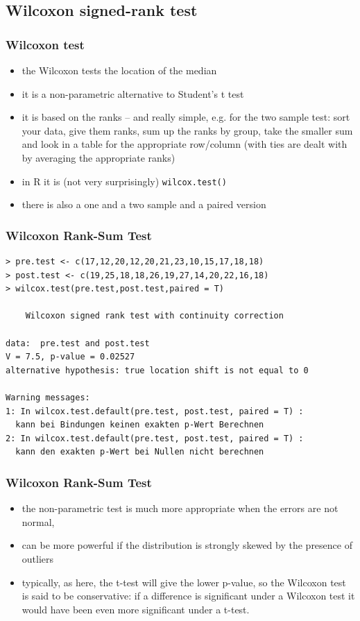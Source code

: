 \documentclass[xcolor={table}]{beamer}
\begin{document}
\subsection{Wilcoxon signed-rank test}
\begin{frame}\frametitle{Wilcoxon test}
    \begin{itemize}
    \item the Wilcoxon tests the location of the median
    \item it is a non-parametric alternative to Student's t test
    \item it is based on the ranks -- and really simple, e.g. for the two sample test: sort your data, give them ranks, sum up the ranks by group, take the smaller sum and look in a table for the appropriate row/column (with ties are dealt with by averaging the appropriate ranks) 
    \item in R it is (not very surprisingly) \texttt{wilcox.test()}
    \item there is also a one and a two sample and a paired version
    \end{itemize}
\end{frame}

\begin{frame}[fragile]\frametitle{Wilcoxon Rank-Sum Test}\footnotesize
\begin{verbatim}
> pre.test <- c(17,12,20,12,20,21,23,10,15,17,18,18)
> post.test <- c(19,25,18,18,26,19,27,14,20,22,16,18)
> wilcox.test(pre.test,post.test,paired = T)

	Wilcoxon signed rank test with continuity correction

data:  pre.test and post.test
V = 7.5, p-value = 0.02527
alternative hypothesis: true location shift is not equal to 0

Warning messages:
1: In wilcox.test.default(pre.test, post.test, paired = T) :
  kann bei Bindungen keinen exakten p-Wert Berechnen
2: In wilcox.test.default(pre.test, post.test, paired = T) :
  kann den exakten p-Wert bei Nullen nicht berechnen
\end{verbatim}
\end{frame}

\begin{frame}[fragile]\frametitle{Wilcoxon Rank-Sum Test}
\begin{itemize}
\item the non-parametric test is much more appropriate when the errors are not normal, 
\item can be more powerful if the distribution is strongly skewed by the presence of outliers
\item typically, as here, the t-test will give the lower p-value, so the Wilcoxon test is said to be conservative: if a difference is significant under a Wilcoxon test it would have been even more significant under a t-test.
\end{itemize}
\end{frame}
\end{document}
